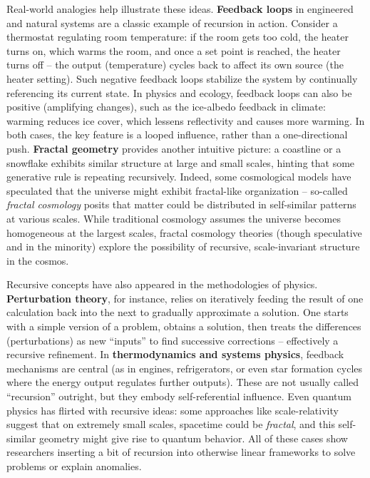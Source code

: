 Real-world analogies help illustrate these ideas. \textbf{Feedback
loops} in engineered and natural systems are a classic example of
recursion in action. Consider a thermostat regulating room temperature:
if the room gets too cold, the heater turns on, which warms the room,
and once a set point is reached, the heater turns off -- the output
(temperature) cycles back to affect its own source (the heater setting).
Such negative feedback loops stabilize the system by continually
referencing its current state. In physics and ecology, feedback loops
can also be positive (amplifying changes), such as the ice-albedo
feedback in climate: warming reduces ice cover, which lessens
reflectivity and causes more warming. In both cases, the key feature is
a looped influence, rather than a one-directional push. \textbf{Fractal
geometry} provides another intuitive picture: a coastline or a snowflake
exhibits similar structure at large and small scales, hinting that some
generative rule is repeating recursively. Indeed, some cosmological
models have speculated that the universe might exhibit fractal-like
organization -- so-called \emph{fractal cosmology} posits that matter
could be distributed in self-similar patterns at various scales​. While
traditional cosmology assumes the universe becomes homogeneous at the
largest scales, fractal cosmology theories (though speculative and in
the minority) explore the possibility of recursive, scale-invariant
structure in the cosmos​.

Recursive concepts have also appeared in the methodologies of physics.
\textbf{Perturbation theory}, for instance, relies on iteratively
feeding the result of one calculation back into the next to gradually
approximate a solution. One starts with a simple version of a problem,
obtains a solution, then treats the differences (perturbations) as new
``inputs'' to find successive corrections -- effectively a recursive
refinement. In \textbf{thermodynamics and systems physics}, feedback
mechanisms are central (as in engines, refrigerators, or even star
formation cycles where the energy output regulates further outputs).
These are not usually called ``recursion'' outright, but they embody
self-referential influence. Even quantum physics has flirted with
recursive ideas: some approaches like scale-relativity suggest that on
extremely small scales, spacetime could be \emph{fractal}, and this
self-similar geometry might give rise to quantum behavior​. All of these
cases show researchers inserting a bit of recursion into otherwise
linear frameworks to solve problems or explain anomalies.

